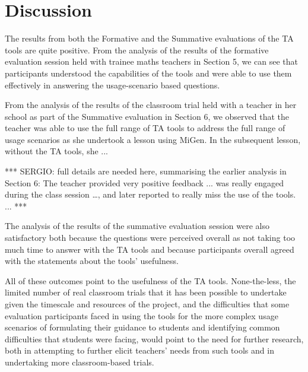 
\section{Discussion}
\label{sec:discussion}

The results from both the Formative and the Summative evaluations of
the TA tools are quite positive. From the analysis of the results of
the formative evaluation session held with trainee maths teachers in
Section 5, we can see that participants understood the capabilities of
the tools and were able to use them effectively in answering the
usage-scenario based questions. 

From the analysis of the results of the classroom trial held with a
teacher in her school as part of the Summative evaluation in Section
6, we observed that the teacher was able to use the full range of TA
tools to address the full range of usage scenarios as she undertook a
lesson using MiGen. In the subsequent lesson, without the TA tools,
she ...

*** SERGIO:  full details are needed here, summarising the earlier
analysis in Section 6: The teacher provided very positive feedback
... was really engaged during the class session …, 
and later reported to really miss the use of the tools. ... ***

The analysis of the results of the summative evaluation session
were also satisfactory both because the questions 
were perceived overall as not taking too much time to answer 
with the TA tools and because participants overall agreed with the
statements about the tools' usefulness. 

All of these outcomes point to the usefulness of the TA
tools. None-the-less, the limited number of real classroom trials that
it has been possible to undertake given the timescale and resources of
the project, and the difficulties that some evaluation participants
faced in using the tools for the more complex usage scenarios of
formulating their guidance to students and identifying common
difficulties that students were facing, would point to the need for
further research, both in attempting to further elicit teachers’ needs
from such tools and in undertaking more classroom-based
trials.

